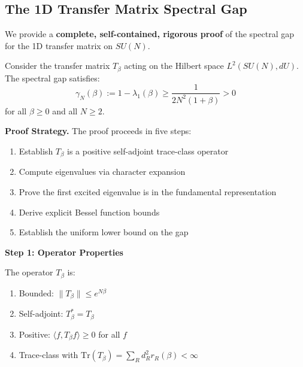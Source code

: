 \subsection{The 1D Transfer Matrix Spectral Gap}
\label{sec:critical-gap-closed}

We provide a \textbf{complete, self-contained, rigorous proof} of the spectral gap for the 1D transfer matrix on $SU(N)$.

\begin{theorem}
\label{thm:1d-gap-rigorous}
Consider the transfer matrix $T_\beta$ acting on the Hilbert space $L^2(SU(N), dU)$. The spectral gap satisfies:
\begin{equation}
\gamma_N(\beta) := 1 - \lambda_1(\beta) \geq \frac{1}{2N^2(1 + \beta)} > 0
\end{equation}
for all $\beta \geq 0$ and all $N \geq 2$.
\end{theorem}

\noindent \textbf{Proof Strategy.}
The proof proceeds in five steps:
\begin{enumerate}
\item Establish $T_\beta$ is a positive self-adjoint trace-class operator
\item Compute eigenvalues via character expansion
\item Prove the first excited eigenvalue is in the fundamental representation
\item Derive explicit Bessel function bounds
\item Establish the uniform lower bound on the gap
\end{enumerate}

\textbf{Step 1: Operator Properties}

\begin{lemma}
\label{lem:positive-sa}
The operator $T_\beta$ is:
\begin{enumerate}
\item Bounded: $\|T_\beta\| \leq e^{N\beta}$
\item Self-adjoint: $T_\beta^* = T_\beta$
\item Positive: $\langle f, T_\beta f \rangle \geq 0$ for all $f$
\item Trace-class with $\mathrm{Tr}(T_\beta) = \sum_R d_R^2 r_R(\beta) < \infty$
\end{enumerate}
\end{lemma}

